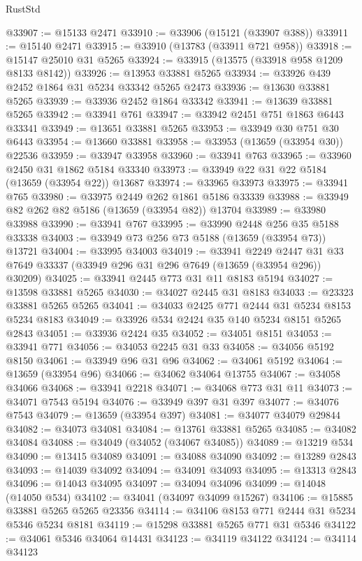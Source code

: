 \begin{lexlean}{RustStd}
\begin{coremodule}
@33907 := @15133 @2471
@33910 := @33906 (@15121 (@33907 @388))
@33911 := @15140 @2471
@33915 := @33910 (@13783 (@33911 @721 @958))
@33918 := @15147 @25010 @31 @5265
@33924 := @33915 (@13575 (@33918 @958 @1209 @8133 @8142))
@33926 := @13953 @33881 @5265
@33934 := @33926 @439 @2452 @1864 @31 @5234 @33342 @5265 @2473
@33936 := @13630 @33881 @5265
@33939 := @33936 @2452 @1864 @33342
@33941 := @13639 @33881 @5265
@33942 := @33941 @761
@33947 := @33942 @2451 @751 @1863 @6443 @33341
@33949 := @13651 @33881 @5265
@33953 := @33949 @30 @751 @30 @6443
@33954 := @13660 @33881
@33958 := @33953 (@13659 (@33954 @30)) @22536
@33959 := @33947 @33958
@33960 := @33941 @763
@33965 := @33960 @2450 @31 @1862 @5184 @33340
@33973 := @33949 @22 @31 @22 @5184 (@13659 (@33954 @22)) @13687
@33974 := @33965 @33973
@33975 := @33941 @765
@33980 := @33975 @2449 @262 @1861 @5186 @33339
@33988 := @33949 @82 @262 @82 @5186 (@13659 (@33954 @82)) @13704
@33989 := @33980 @33988
@33990 := @33941 @767
@33995 := @33990 @2448 @256 @35 @5188 @33338
@34003 := @33949 @73 @256 @73 @5188 (@13659 (@33954 @73)) @13721
@34004 := @33995 @34003
@34019 := @33941
    @2249
    @2447
    @31
    @33
    @7649
    @33337
    (@33949 @296 @31 @296 @7649 (@13659 (@33954 @296)) @30209)
@34025 := @33941 @2445 @773 @31 @11 @8183 @5194
@34027 := @13598 @33881 @5265
@34030 := @34027 @2445 @31 @8183
@34033 := @23323 @33881 @5265 @5265
@34041 := @34033 @2425 @771 @2444 @31 @5234 @8153 @5234 @8183
@34049 := @33926 @534 @2424 @35 @140 @5234 @8151 @5265 @2843
@34051 := @33936 @2424 @35
@34052 := @34051 @8151
@34053 := @33941 @771
@34056 := @34053 @2245 @31 @33
@34058 := @34056 @5192 @8150
@34061 := @33949 @96 @31 @96
@34062 := @34061 @5192
@34064 := @13659 (@33954 @96)
@34066 := @34062 @34064 @13755
@34067 := @34058 @34066
@34068 := @33941 @2218
@34071 := @34068 @773 @31 @11
@34073 := @34071 @7543 @5194
@34076 := @33949 @397 @31 @397
@34077 := @34076 @7543
@34079 := @13659 (@33954 @397)
@34081 := @34077 @34079 @29844
@34082 := @34073 @34081
@34084 := @13761 @33881 @5265
@34085 := @34082 @34084
@34088 := @34049 (@34052 (@34067 @34085))
@34089 := @13219 @534
@34090 := @13415 @34089
@34091 := @34088 @34090
@34092 := @13289 @2843
@34093 := @14039 @34092
@34094 := @34091 @34093
@34095 := @13313 @2843
@34096 := @14043 @34095
@34097 := @34094 @34096
@34099 := @14048 (@14050 @534)
@34102 := @34041 (@34097 @34099 @15267)
@34106 := @15885 @33881 @5265 @5265 @23356
@34114 := @34106 @8153 @771 @2444 @31 @5234 @5346 @5234 @8181
@34119 := @15298 @33881 @5265 @771 @31 @5346
@34122 := @34061 @5346 @34064 @14431
@34123 := @34119 @34122
@34124 := @34114 @34123

\end{coremodule}
\end{lexlean}
